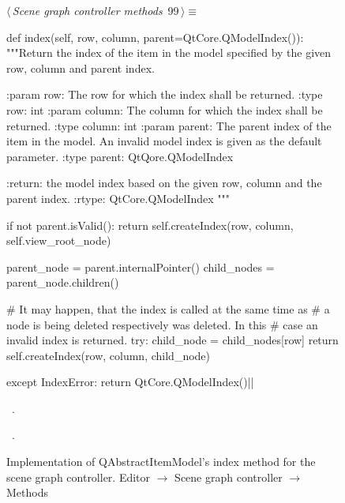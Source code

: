 \documentclass[%
    a4paper,    %
    justified,  %
    nobib,      %
    openany     %
]{tufte-book}
\makeatletter
\renewcommand{\label}[1]{\@tufte@label{##1}}%
\makeatother
\begin{document}
\begin{figure}[!htbp]
\begin{flushleft} \small
\begin{minipage}{\linewidth}\label{scrap30}\raggedright\small
{} $\langle\,${\itshape Scene graph controller methods}\nobreak\ {\footnotesize {99}}$\,\rangle\equiv$
\vspace{-1ex}
\begin{pythoncode}
def index(self, row, column, parent=QtCore.QModelIndex()):
    """Return the index of the item in the model specified by the
    given row, column and parent index.

    :param row: The row for which the index shall be returned.
    :type  row: int
    :param column: The column for which the index shall be
                   returned.
    :type column:  int
    :param parent: The parent index of the item in the model. An
                   invalid model index is given as the default
                   parameter.
    :type parent: QtQore.QModelIndex

    :return: the model index based on the given row, column and
             the parent index.
    :rtype: QtCore.QModelIndex
    """

    if not parent.isValid():
        return self.createIndex(row, column, self.view_root_node)

    parent_node = parent.internalPointer()
    child_nodes = parent_node.children()

    # It may happen, that the index is called at the same time as
    # a node is being deleted respectively was deleted. In this
    # case an invalid index is returned.
    try:
        child_node  = child_nodes[row]
        return self.createIndex(row, column, child_node)

    except IndexError:
        return QtCore.QModelIndex()|\NWsep|
\end{pythoncode}
\vspace{1.5ex}
\footnotesize
\begin{list}{}{\setlength{\itemsep}{-\parsep}\setlength{\itemindent}{-\leftmargin}}
\item \NWtxtMacroDefBy\ .
\item \NWtxtMacroRefIn\ .

\item{}
\end{list}
\end{minipage}\vspace{4ex}
\end{flushleft}
\caption{Implementation of QAbstractItemModel's index method for the scene graph
  controller.
  \newline{}\newline{}Editor $\rightarrow$ Scene graph controller $\rightarrow$
  Methods}
\end{figure}
\end{document}
